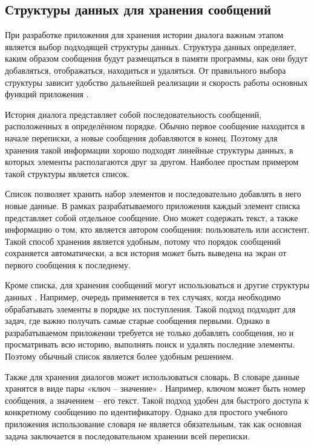 \documentclass[12pt,a4paper]{article}
\begin{document}
\subsection{Структуры данных для хранения сообщений}

При разработке приложения для хранения истории диалога важным этапом является выбор подходящей структуры данных. Структура данных определяет, каким образом сообщения будут размещаться в памяти программы, как они будут добавляться, отображаться, находиться и удаляться. От правильного выбора структуры зависит удобство дальнейшей реализации и скорость работы основных функций приложения \cite{ref1,ref2}.

История диалога представляет собой последовательность сообщений, расположенных в определённом порядке. Обычно первое сообщение находится в начале переписки, а новые сообщения добавляются в конец. Поэтому для хранения такой информации хорошо подходят линейные структуры данных, в которых элементы располагаются друг за другом. Наиболее простым примером такой структуры является список.

Список позволяет хранить набор элементов и последовательно добавлять в него новые данные. В рамках разрабатываемого приложения каждый элемент списка представляет собой отдельное сообщение. Оно может содержать текст, а также информацию о том, кто является автором сообщения: пользователь или ассистент. Такой способ хранения является удобным, потому что порядок сообщений сохраняется автоматически, а вся история может быть выведена на экран от первого сообщения к последнему.

Кроме списка, для хранения сообщений могут использоваться и другие структуры данных \cite{ref1,ref4}. Например, очередь применяется в тех случаях, когда необходимо обрабатывать элементы в порядке их поступления. Такой подход подходит для задач, где важно получать самые старые сообщения первыми. Однако в разрабатываемом приложении требуется не только добавлять сообщения, но и просматривать всю историю, выполнять поиск и удалять последние элементы. Поэтому обычный список является более удобным решением.

Также для хранения диалогов может использоваться словарь. В словаре данные хранятся в виде пары «ключ -- значение» \cite{ref2,ref4}. Например, ключом может быть номер сообщения, а значением -- его текст. Такой подход удобен для быстрого доступа к конкретному сообщению по идентификатору. Однако для простого учебного приложения использование словаря не является обязательным, так как основная задача заключается в последовательном хранении всей переписки.
\end{document}
